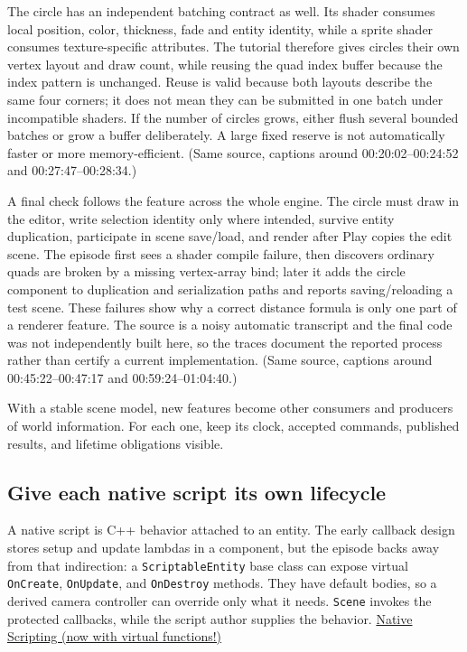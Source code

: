 The circle has an independent batching contract as well. Its shader consumes local position, color, thickness, fade and entity identity, while a sprite shader consumes texture-specific attributes. The tutorial therefore gives circles their own vertex layout and draw count, while reusing the quad index buffer because the index pattern is unchanged. Reuse is valid because both layouts describe the same four corners; it does not mean they can be submitted in one batch under incompatible shaders. If the number of circles grows, either flush several bounded batches or grow a buffer deliberately. A large fixed reserve is not automatically faster or more memory-efficient. (Same source, captions around 00:20:02--00:24:52 and 00:27:47--00:28:34.)

A final check follows the feature across the whole engine. The circle must draw in the editor, write selection identity only where intended, survive entity duplication, participate in scene save/load, and render after Play copies the edit scene. The episode first sees a shader compile failure, then discovers ordinary quads are broken by a missing vertex-array bind; later it adds the circle component to duplication and serialization paths and reports saving/reloading a test scene. These failures show why a correct distance formula is only one part of a renderer feature. The source is a noisy automatic transcript and the final code was not independently built here, so the traces document the reported process rather than certify a current implementation. (Same source, captions around 00:45:22--00:47:17 and 00:59:24--01:04:40.)

With a stable scene model, new features become other consumers and producers of world information. For each one, keep its clock, accepted commands, published results, and lifetime obligations visible.

\subsection{Give each native script its own lifecycle}\label{06-engine-ii-ch040-give-each-native-script-its-own-lifecycle}

A native script is C++ behavior attached to an entity. The early callback design stores setup and update lambdas in a component, but the episode backs away from that indirection: a \texttt{ScriptableEntity} base class can expose virtual \texttt{OnCreate}, \texttt{OnUpdate}, and \texttt{OnDestroy} methods. They have default bodies, so a derived camera controller can override only what it needs. \texttt{Scene} invokes the protected callbacks, while the script author supplies the behavior. \href{https://www.youtube.com/watch?v=1cHEcrIn8IQ}{Native Scripting (now with virtual functions!)}

